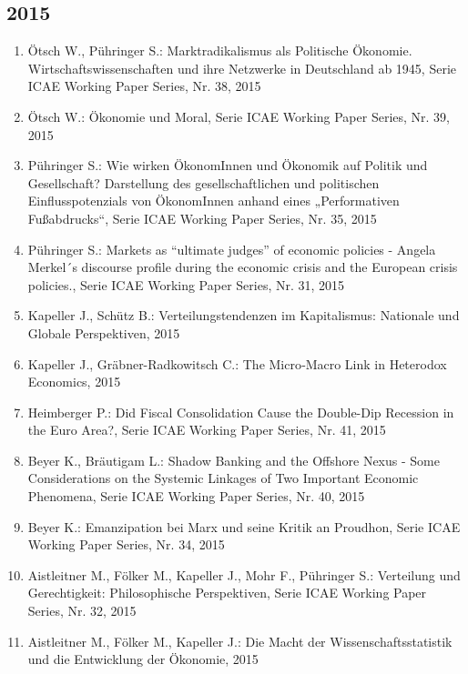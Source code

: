 \subsection*{2015}
\begin{enumerate}
    	 \item Ötsch W., Pühringer S.: Marktradikalismus als Politische Ökonomie. Wirtschaftswissenschaften und ihre Netzwerke in Deutschland ab 1945, Serie ICAE Working Paper Series, Nr. 38, 2015
	 \item Ötsch W.: Ökonomie und Moral, Serie ICAE Working Paper Series, Nr. 39, 2015
	 \item Pühringer S.: Wie wirken ÖkonomInnen und Ökonomik auf Politik und Gesellschaft? Darstellung des gesellschaftlichen und politischen Einflusspotenzials von ÖkonomInnen anhand eines „Performativen Fußabdrucks“, Serie ICAE Working Paper Series, Nr. 35, 2015
	 \item Pühringer S.: Markets as “ultimate judges” of economic policies - Angela Merkel´s discourse profile during the economic crisis and the European crisis policies., Serie ICAE Working Paper Series, Nr. 31, 2015
	 \item Kapeller J., Schütz B.: Verteilungstendenzen im Kapitalismus: Nationale und Globale Perspektiven, 2015
	 \item Kapeller J., Gräbner-Radkowitsch C.: The Micro‐Macro Link in Heterodox Economics, 2015
	 \item Heimberger P.: Did Fiscal Consolidation Cause the Double-Dip Recession in the Euro Area?, Serie ICAE Working Paper Series, Nr. 41, 2015
	 \item Beyer K., Bräutigam L.: Shadow Banking and the Offshore Nexus - Some Considerations on the Systemic Linkages of Two Important Economic Phenomena, Serie ICAE Working Paper Series, Nr. 40, 2015
	 \item Beyer K.: Emanzipation bei Marx und seine Kritik an Proudhon, Serie ICAE Working Paper Series, Nr. 34, 2015
	 \item Aistleitner M., Fölker M., Kapeller J., Mohr F., Pühringer S.: Verteilung und Gerechtigkeit: Philosophische Perspektiven, Serie ICAE Working Paper Series, Nr. 32, 2015
	 \item Aistleitner M., Fölker M., Kapeller J.: Die Macht der Wissenschaftsstatistik und die Entwicklung der Ökonomie, 2015
\end{enumerate}
